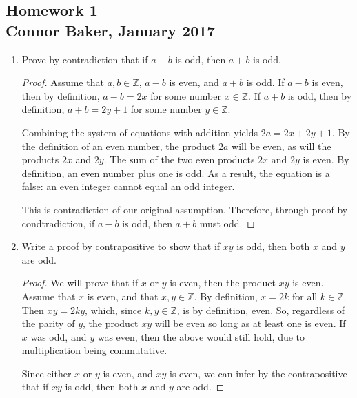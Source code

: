 \documentclass[10pt]{article}
\theoremstyle{definition}
\theoremstyle{plain}
\newcommand{\Z}{\mathbb{Z}}
\begin{document}
\begin{center}
\subsection*{Homework 1\\Connor Baker, January 2017}
\end{center}

\begin{enumerate}
\item Prove by contradiction that if $a-b$ is odd, then $a+b$ is odd.
  \begin{proof}
    Assume that $a,b\in\Z$, $a-b$ is even, and $a+b$ is odd. If $a-b$ is even, then by definition, $a-b=2x$ for some number $x\in\Z$. If $a+b$ is odd, then by definition, $a+b=2y+1$ for some number $y\in\Z$.

    \par Combining the system of equations with addition yields $2a=2x+2y+1$. By the definition of an even number, the product $2a$ will be even, as will the products $2x$ and $2y$. The sum of the two even products $2x$ and $2y$ is even. By definition, an even number plus one is odd. As a result, the equation is a false: an even integer cannot equal an odd integer.

    \par This is contradiction of our original assumption. Therefore, through proof by condtradiction, if $a-b$ is odd, then $a+b$ must odd.
  \end{proof}

\item Write a proof by contrapositive to show that if $xy$ is odd, then both $x$ and $y$ are odd.
  \begin{proof}
    We will prove that if $x$ or $y$ is even, then the product $xy$ is even. Assume that $x$ is even, and that $x,y\in\Z$. By definition, $x=2k$ for all $k\in\Z$. Then $xy=2ky$, which, since $k,y\in\Z$, is by definition, even. So, regardless of the parity of $y$, the product $xy$ will be even so long as at least one is even. If $x$ was odd, and $y$ was even, then the above would still hold, due to multiplication being commutative.

    \par Since either $x$ or $y$ is even, and $xy$ is even, we can infer by the contrapositive that if $xy$ is odd, then both $x$ and $y$ are odd.
  \end{proof}


\end{enumerate}
\end{document}
